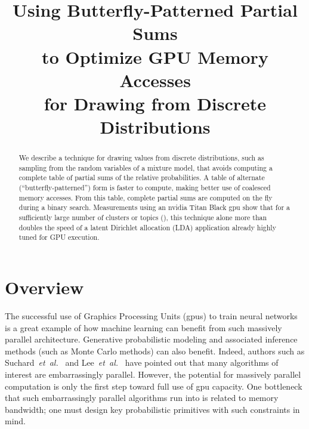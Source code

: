 \documentclass[10pt,nohyperref]{sigplanconf}
\begin{document}
 



\title{Using Butterfly-Patterned Partial Sums \\ to Optimize GPU Memory Accesses \\ for Drawing from Discrete Distributions}
\subtitle{}

\maketitle




\begin{abstract} 
We describe a technique for drawing values from discrete distributions,
such as sampling from the random variables of a mixture model,
that avoids computing a complete table of partial
sums of the relative probabilities.  A table of alternate
(``butterfly-patterned'') form is faster to compute, making
better use of coalesced memory accesses.  From this table,
complete partial sums are computed on the fly during a binary search.
Measurements using an {\sc nvidia} Titan Black {\sc gpu} show that for a sufficiently large number
of clusters or topics (), this technique alone more than doubles
the speed of a latent Dirichlet allocation ({\sc LDA}) application already highly tuned for GPU execution.
\end{abstract} 




\section{Overview}
\label{sec:overview}

The successful use of Graphics Processing Units ({\sc gpu}s) to train neural
networks is a great example of how machine learning can benefit from
such massively parallel architecture. Generative
probabilistic modeling \cite{Blei}
and associated inference methods (such as Monte Carlo
methods) can also benefit. Indeed,
authors such as Suchard~{\it et~al.}~\cite{suchard_understanding_2010} and
Lee~{\it et~al.}~\cite{lee_utility_journal_2010} have pointed out that many algorithms of
interest are embarrassingly parallel. However, the potential for massively
parallel computation is only the first step toward full
use of {\sc gpu} capacity.  One bottleneck that such embarrassingly parallel
algorithms run into is related to memory bandwidth; one must
design key probabilistic primitives with such constraints in mind.
\end{document}

